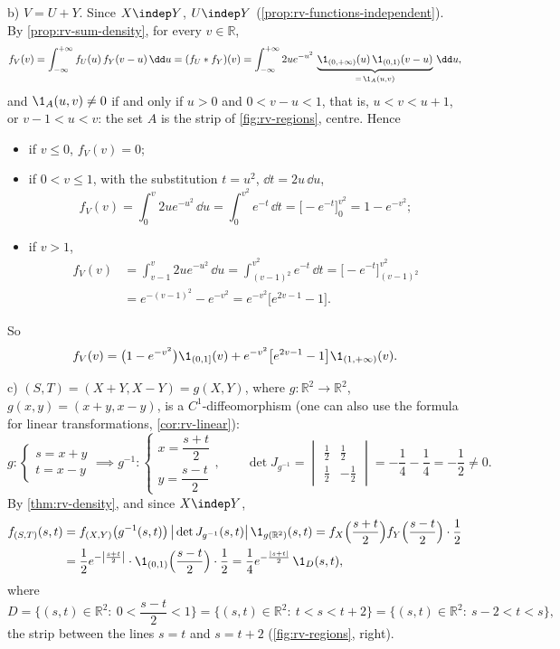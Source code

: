 \begin{example}
b) $V=U+Y$. Since $X\indep Y$, $U\indep Y$ (\cref{prop:rv-functions-independent}). By
\cref{prop:rv-sum-density}, for every $v\in\mathbb R$,
\[
  f_V(v)=\int_{-\infty}^{+\infty}f_U(u)\,f_Y(v-u)\,\dd u=(f_U*f_Y)(v)
  =\int_{-\infty}^{+\infty}2ue^{-u^2}\,\underbrace{\1_{(0,+\infty)}(u)\,\1_{(0,1)}(v-u)}_{=\,\1_A(u,v)}\,\dd u,
\]
and $\1_A(u,v)\ne0$ if and only if $u>0$ and $0<v-u<1$, that is, $u<v<u+1$, or $v-1<u<v$: the set
$A$ is the strip of \cref{fig:rv-regions}, centre. Hence
\begin{itemize}
  \item if $v\le0$, $f_V(v)=0$;
  \item if $0<v\le1$, with the substitution $t=u^2$, $\dd t=2u\,\dd u$,
    \[
      f_V(v)=\int_0^v2ue^{-u^2}\,\dd u=\int_0^{v^2}e^{-t}\,\dd t=\big[-e^{-t}\big]_0^{v^2}=1-e^{-v^2};
    \]
  \item if $v>1$,
    \[
    \begin{aligned}
      f_V(v)&=\int_{v-1}^v2ue^{-u^2}\,\dd u=\int_{(v-1)^2}^{v^2}e^{-t}\,\dd t=\big[-e^{-t}\big]_{(v-1)^2}^{v^2}\\
      &=e^{-(v-1)^2}-e^{-v^2}=e^{-v^2}\big[e^{2v-1}-1\big].
    \end{aligned}
    \]
\end{itemize}
So
\[
  f_V(v)=\big(1-e^{-v^2}\big)\1_{(0,1]}(v)+e^{-v^2}\big[e^{2v-1}-1\big]\1_{(1,+\infty)}(v).
\]

c) $(S,T)=(X+Y,X-Y)=g(X,Y)$, where $g:\mathbb R^2\to\mathbb R^2$, $g(x,y)=(x+y,x-y)$, is a
$C^1$-diffeomorphism (one can also use the formula for linear transformations,
\cref{cor:rv-linear}):
\[
  g:\begin{cases}s=x+y\\t=x-y\end{cases}\implies g^{-1}:\begin{cases}x=\dfrac{s+t}2\\[4pt]y=\dfrac{s-t}2\end{cases},
  \qquad
  \det J_{g^{-1}}=\begin{vmatrix}\frac12&\frac12\\[2pt]\frac12&-\frac12\end{vmatrix}=-\frac14-\frac14=-\frac12\ne0 .
\]
By \cref{thm:rv-density}, and since $X\indep Y$,
\[
\begin{aligned}
  f_{(S,T)}(s,t)&=f_{(X,Y)}\big(g^{-1}(s,t)\big)\,\big|\det J_{g^{-1}}(s,t)\big|\,\1_{g(\mathbb R^2)}(s,t)
  =f_X\Big(\frac{s+t}2\Big)f_Y\Big(\frac{s-t}2\Big)\cdot\frac12\\
  &=\frac12e^{-\left|\frac{s+t}2\right|}\cdot\1_{(0,1)}\Big(\frac{s-t}2\Big)\cdot\frac12
  =\frac14e^{-\frac{|s+t|}2}\,\1_D(s,t),
\end{aligned}
\]
where
\[
  D=\Big\{(s,t)\in\mathbb R^2:\ 0<\frac{s-t}2<1\Big\}=\big\{(s,t)\in\mathbb R^2:\ t<s<t+2\big\}
  =\big\{(s,t)\in\mathbb R^2:\ s-2<t<s\big\},
\]
the strip between the lines $s=t$ and $s=t+2$ (\cref{fig:rv-regions}, right).
\end{example}

